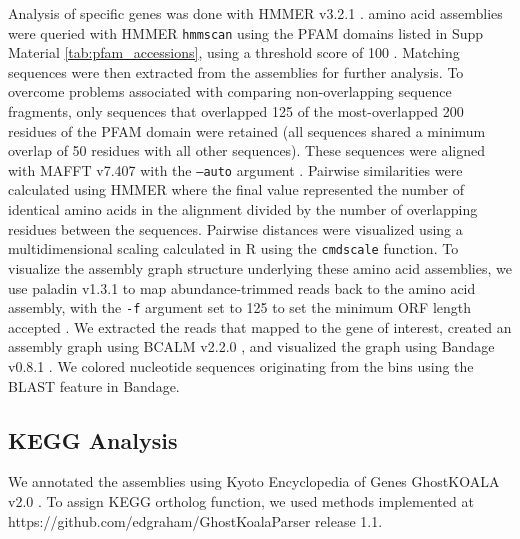 Analysis of specific genes was done with HMMER v3.2.1
\cite{hmmer}. \plass amino acid assemblies were queried with HMMER {\tt hmmscan}
 using the PFAM domains listed in Supp Material \ref{tab:pfam_accessions}, 
using a threshold score of 100 \cite{pfam}. Matching sequences were then
extracted from the assemblies for further analysis. To overcome
problems associated with comparing non-overlapping sequence fragments,
only sequences that overlapped 125 of the most-overlapped 200 residues
of the PFAM domain were retained (all sequences shared a minimum
overlap of 50 residues with all other sequences). These sequences were
aligned with MAFFT v7.407 with the {\tt --auto} argument \cite{mafft}. Pairwise similarities were
calculated using HMMER where the final value represented the number of
identical amino acids in the alignment divided by the number of
overlapping residues between the sequences. Pairwise distances were
visualized using a multidimensional scaling calculated in R using the
{\tt cmdscale} function. To visualize the assembly graph structure
underlying these amino acid assemblies, we use paladin v1.3.1 
to map abundance-trimmed reads back to the \plass amino acid assembly,
with the {\tt -f} argument set to 125 to set the minimum ORF length accepted \cite{paladin}. 
We extracted the reads that mapped to the gene of interest, created an
assembly graph using BCALM v2.2.0 \cite{chikhi2016compacting}, and
visualized the graph using Bandage v0.8.1 \cite{bandage}. We colored
nucleotide sequences originating from the bins using the BLAST feature
in Bandage.

\subsection*{KEGG Analysis}

We annotated the \plass assemblies using Kyoto Encyclopedia of Genes
GhostKOALA v2.0 \cite{kegg}. To assign KEGG ortholog function, we used
methods implemented at https://github.com/edgraham/GhostKoalaParser
release 1.1.
